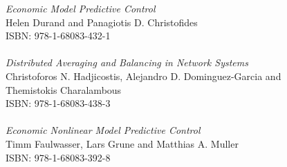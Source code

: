 \vspace{12pt}
\noindent \textit{Economic Model Predictive Control}\\
Helen Durand and Panagiotis D. Christofides\\
ISBN: 978-1-68083-432-1\\
\\
\noindent \textit{Distributed Averaging and Balancing in Network Systems}\\
Christoforos N. Hadjicostis, Alejandro D. Dominguez-Garcia and\\ Themistokis Charalambous\\
ISBN: 978-1-68083-438-3\\
\\
\noindent \textit{Economic Nonlinear Model Predictive Control}\\
Timm Faulwasser, Lars Grune and Matthias A. Muller\\
ISBN: 978-1-68083-392-8
